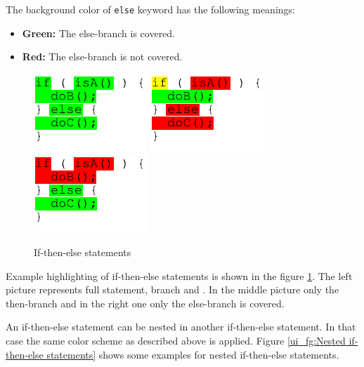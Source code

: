 \par
The background color of \texttt{else} keyword has the following meanings:
\begin{itemize}
\item \textbf{Green:}  The else-branch is covered.
\item \textbf{Red:}  The else-branch is not covered.
\end{itemize}
\par
\begin{figure}[hbt]
 \hfill
 \includegraphics[]{images/Source_Code_Highlighting/if/if_with_else_green}
 \hfill
 \includegraphics[]{images/Source_Code_Highlighting/if/if_with_else_yellow}
 \hfill
 \includegraphics[]{images/Source_Code_Highlighting/if/if_with_else_red-green}
 \hspace{1cm}
 \hfill
 \caption{If-then-else statements}
 \label{ui_fg:If-then-else statements}
\end{figure}
\par
Example highlighting of if-then-else statements is shown in the figure  \ref{ui_fg:If-then-else statements}. The left picture represents full statement, branch and . In the middle picture only the then-branch and in the right one only the else-branch is covered. 
\par
An if-then-else statement can be nested in another if-then-else statement. In that case the same color scheme as described above is applied. Figure \ref{ui_fg:Nested if-then-else statements} shows some examples for nested if-then-else statements.
